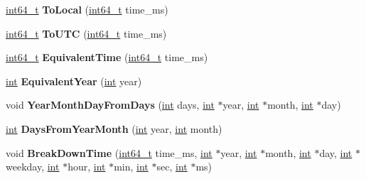 \begin{DoxyCompactItemize}
\mbox{\label{classv8_1_1internal_1_1DateCache_a8deadbe8d0a827ed155d396ef3c4e164}} 
\mbox{\hyperlink{classint64__t}{int64\+\_\+t}} {\bfseries To\+Local} (\mbox{\hyperlink{classint64__t}{int64\+\_\+t}} time\+\_\+ms)
\item 
\mbox{\label{classv8_1_1internal_1_1DateCache_aa9c27e444fd19db8bd922f49510906e4}} 
\mbox{\hyperlink{classint64__t}{int64\+\_\+t}} {\bfseries To\+U\+TC} (\mbox{\hyperlink{classint64__t}{int64\+\_\+t}} time\+\_\+ms)
\item 
\mbox{\label{classv8_1_1internal_1_1DateCache_af3dd4e80a7ac5044eeb20817d6134bd1}} 
\mbox{\hyperlink{classint64__t}{int64\+\_\+t}} {\bfseries Equivalent\+Time} (\mbox{\hyperlink{classint64__t}{int64\+\_\+t}} time\+\_\+ms)
\item 
\mbox{\label{classv8_1_1internal_1_1DateCache_a0c170e47eb85e4d7ee1a991290571685}} 
\mbox{\hyperlink{classint}{int}} {\bfseries Equivalent\+Year} (\mbox{\hyperlink{classint}{int}} year)
\item 
\mbox{\label{classv8_1_1internal_1_1DateCache_a5aa2a0800947deeb859a1392cb4e050d}} 
void {\bfseries Year\+Month\+Day\+From\+Days} (\mbox{\hyperlink{classint}{int}} days, \mbox{\hyperlink{classint}{int}} $\ast$year, \mbox{\hyperlink{classint}{int}} $\ast$month, \mbox{\hyperlink{classint}{int}} $\ast$day)
\item 
\mbox{\label{classv8_1_1internal_1_1DateCache_a1eab5288c1b1da6639e14bf4e93509d3}} 
\mbox{\hyperlink{classint}{int}} {\bfseries Days\+From\+Year\+Month} (\mbox{\hyperlink{classint}{int}} year, \mbox{\hyperlink{classint}{int}} month)
\item 
\mbox{\label{classv8_1_1internal_1_1DateCache_a2584079b2ee679f52e43c1fb926c1ac7}} 
void {\bfseries Break\+Down\+Time} (\mbox{\hyperlink{classint64__t}{int64\+\_\+t}} time\+\_\+ms, \mbox{\hyperlink{classint}{int}} $\ast$year, \mbox{\hyperlink{classint}{int}} $\ast$month, \mbox{\hyperlink{classint}{int}} $\ast$day, \mbox{\hyperlink{classint}{int}} $\ast$weekday, \mbox{\hyperlink{classint}{int}} $\ast$hour, \mbox{\hyperlink{classint}{int}} $\ast$min, \mbox{\hyperlink{classint}{int}} $\ast$sec, \mbox{\hyperlink{classint}{int}} $\ast$ms)

\end{DoxyCompactItemize}
